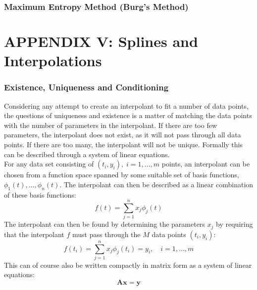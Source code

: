 \documentclass[../../CompleteThesis2/Complete_2ndDraft.tex]{subfiles}
\begin{document}
	
	\subsubsection[MEM][MEM]{Maximum Entropy Method (Burg's Method)}
	\label{Subsubsec:SignalAnalysis_BackDiffusion_SpectralAnalysis_MEM}
	
	
	
	\newpage
	\section[Appendix V: Splines and Interpolations]{APPENDIX V: Splines and Interpolations}
	\label{AppV:SplinesAndInterpolation}
	
	\subsubsection[Existence and Uniqueness]{Existence, Uniqueness and Conditioning}
	Considering any attempt to create an interpolant to fit a number of data points, the questions of uniqueness and existence is a matter of matching the data points with the number of parameters in the interpolant. If there are too few parameters, the interpolant does not exist, as it will not pass through all data points. If there are too many, the interpolant will not be unique. Formally this can be described through a system of linear equations.\\
	For any data set consisting of $(t_i, y_i),\; i=1,...,m$ points, an interpolant can be chosen from a function space spanned by some suitable set of basis functions, $\phi_1(t),...,\phi_n(t)$. The interpolant can then be described as a linear combination of these basis functions:
	\begin{equation}
		f(t) = \sum_{j=1}^{n} x_j\phi_j(t)
	\end{equation}
	The interpolant can then be found by determining the parameters $x_j$ by requiring that the interpolant $f$ must pass through the $M$ data points $(t_i,y_i)$:
	\begin{equation}
		f(t_i) = \sum_{j=1}^{n} x_j\phi_j(t_i) = y_i, \quad i=1,...,m
	\end{equation}
	This can of course also be written compactly in matrix form as a system of linear equations:
	\begin{equation}
		\boldsymbol{A}\boldsymbol{x}=\boldsymbol{y}
	\end{equation}
\end{document}
